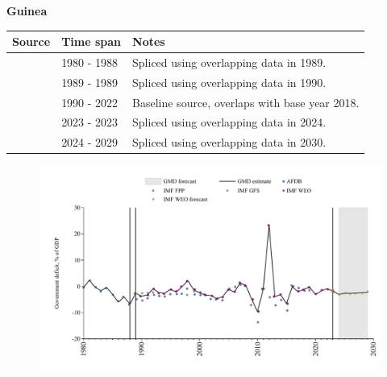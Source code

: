 \documentclass[12pt,a4paper,landscape]{article}
\begin{document}
\begin{adjustbox}{max totalsize={\paperwidth}{\paperheight},center}
\begin{minipage}[t][\textheight][t]{\textwidth}
\vspace*{0.5cm}
{}
\begin{center}
{\Large\bfseries Guinea}
\end{center}
\vspace{0.5cm}
\begin{table}[H]
\centering
\small
\begin{tabular}{|l|l|l|}
\hline
\textbf{Source} & \textbf{Time span} & \textbf{Notes} \\
\hline
\rowcolor{white}\cite{AFDB}& 1980 - 1988 &Spliced using overlapping data in 1989.\\
\rowcolor{lightgray}\cite{IMF_GFS}& 1989 - 1989 &Spliced using overlapping data in 1990.\\
\rowcolor{white}\cite{IMF_WEO}& 1990 - 2022 &Baseline source, overlaps with base year 2018.\\
\rowcolor{lightgray}\cite{IMF_GFS}& 2023 - 2023 &Spliced using overlapping data in 2024.\\
\rowcolor{white}\cite{IMF_WEO_forecast}& 2024 - 2029 &Spliced using overlapping data in 2030.\\
\hline
\end{tabular}
\end{table}
\begin{figure}[H]
\centering
\includegraphics[width=\textwidth,height=0.6\textheight,keepaspectratio]{graphs/GIN_govdef_GDP.pdf}
\end{figure}
\end{minipage}
\end{adjustbox}
\end{document}
